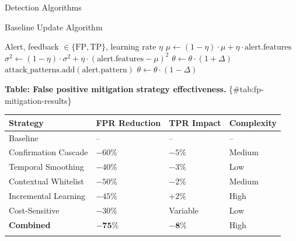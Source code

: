 \documentclass[
  ignorenonframetext,
]{beamer}
\newcounter{none} %
\begin{document}
\begin{frame}{Detection Algorithms}
\begin{block}{Baseline Update Algorithm}
\protect{}\label{baseline-update-algorithm}
\begin{algorithm}
\caption{Online Baseline Update}
\label{alg:baseline-update}
\begin{algorithmic}[1]
\Require Alert, feedback $\in \{\text{FP}, \text{TP}\}$, learning rate $\eta$
    \State $\mu \gets (1-\eta) \cdot \mu + \eta \cdot \text{alert.features}$
    \State $\sigma^2 \gets (1-\eta) \cdot \sigma^2 + \eta \cdot (\text{alert.features} - \mu)^2$
        \State $\theta \gets \theta \cdot (1 + \Delta)$ 
    \EndIf
\Else {}
    \State $\text{attack\_patterns}.\text{add}(\text{alert.pattern})$
        \State $\theta \gets \theta \cdot (1 - \Delta)$ 
    \EndIf
\EndIf
\end{algorithmic}
\end{algorithm}

\textbf{Table: False positive mitigation strategy effectiveness.}
\{\#tab:fp-mitigation-results\}

{\def\LTcaptype{none} %
\begin{longtable}[]{@{}llll@{}}
\toprule\noalign{}
Strategy & FPR Reduction & TPR Impact & Complexity \\
\midrule\noalign{}
\endhead
Baseline & -- & -- & -- \\
Confirmation Cascade & \(-60\%\) & \(-5\%\) & Medium \\
Temporal Smoothing & \(-40\%\) & \(-3\%\) & Low \\
Contextual Whitelist & \(-50\%\) & \(-2\%\) & Medium \\
Incremental Learning & \(-45\%\) & \(+2\%\) & High \\
Cost-Sensitive & \(-30\%\) & Variable & Low \\
\textbf{Combined} & \(\mathbf{-75\%}\) & \(\mathbf{-8\%}\) & High \\
\bottomrule\noalign{}
\end{longtable}
}
\end{block}


\end{frame}
\end{document}
